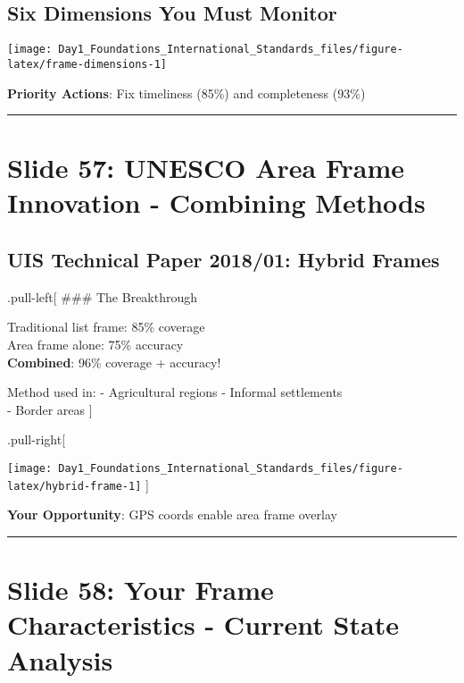 \documentclass[
]{article}
\begin{document}
\subsection{Six Dimensions You Must
Monitor}\label{six-dimensions-you-must-monitor}

\texttt{[image: Day1\_Foundations\_International\_Standards\_files/figure-latex/frame-dimensions-1]}

\textbf{Priority Actions}: Fix timeliness (85\%) and completeness (93\%)

\begin{center}\rule{0.5\linewidth}{0.5pt}\end{center}

\section{Slide 57: UNESCO Area Frame Innovation - Combining
Methods}\label{slide-57-unesco-area-frame-innovation---combining-methods}

\subsection{UIS Technical Paper 2018/01: Hybrid
Frames}\label{uis-technical-paper-201801-hybrid-frames}

.pull-left{[} \#\#\# The Breakthrough

Traditional list frame: 85\% coverage\\
Area frame alone: 75\% accuracy\\
\textbf{Combined}: 96\% coverage + accuracy!

Method used in: - Agricultural regions - Informal settlements\\
- Border areas {]}

.pull-right{[}

\texttt{[image: Day1\_Foundations\_International\_Standards\_files/figure-latex/hybrid-frame-1]}
{]}

\textbf{Your Opportunity}: GPS coords enable area frame overlay

\begin{center}\rule{0.5\linewidth}{0.5pt}\end{center}

\section{Slide 58: Your Frame Characteristics - Current State
Analysis}\label{slide-58-your-frame-characteristics---current-state-analysis}
\end{document}
